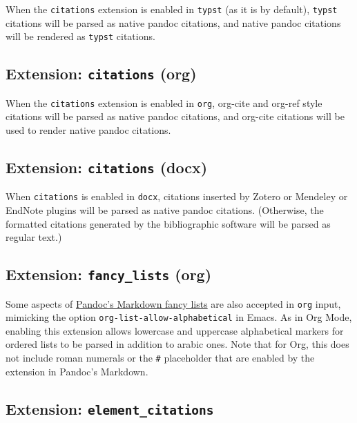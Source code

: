 \documentclass[
  b5paper
]{book}
\begin{document}
When the \texttt{citations} extension is enabled in \texttt{typst} (as
it is by default), \texttt{typst} citations will be parsed as native
pandoc citations, and native pandoc citations will be rendered as
\texttt{typst} citations.

\subsection{\texorpdfstring{Extension: \texttt{citations}
(org)}{Extension: citations (org)}}\label{org-citations}

When the \texttt{citations} extension is enabled in \texttt{org},
org-cite and org-ref style citations will be parsed as native pandoc
citations, and org-cite citations will be used to render native pandoc
citations.

\subsection{\texorpdfstring{Extension: \texttt{citations}
(docx)}{Extension: citations (docx)}}\label{docx-citations}

When \texttt{citations} is enabled in \texttt{docx}, citations inserted
by Zotero or Mendeley or EndNote plugins will be parsed as native pandoc
citations. (Otherwise, the formatted citations generated by the
bibliographic software will be parsed as regular text.)

\subsection{\texorpdfstring{Extension: \texttt{fancy\_lists}
(org)}{Extension: fancy\_lists (org)}}\label{org-fancy-lists}

Some aspects of \hyperref[extension-fancy_lists]{Pandoc's Markdown fancy
lists} are also accepted in \texttt{org} input, mimicking the option
\texttt{org-list-allow-alphabetical} in Emacs. As in Org Mode, enabling
this extension allows lowercase and uppercase alphabetical markers for
ordered lists to be parsed in addition to arabic ones. Note that for
Org, this does not include roman numerals or the \texttt{\#} placeholder
that are enabled by the extension in Pandoc's Markdown.

\subsection{\texorpdfstring{Extension:
\texttt{element\_citations}}{Extension: element\_citations}}\label{extension-element_citations}
\end{document}
